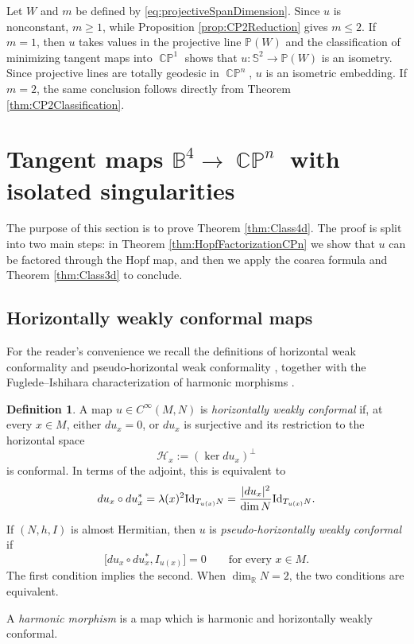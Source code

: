 \documentclass[11pt]{article}
\theoremstyle{plain}
\numberwithin{equation}{section}
\theoremstyle{definition}
\newtheorem{definition}[theorem]{Definition}
\let\oldendproof\endproof
\renewenvironment{proof}[1][\proofname]{%
\oldproof[\upshape \bfseries #1]%
}{\oldendproof}
\def \R {\mathbb{R}}
\def \mc{\mathcal}
\def \mb{\mathbb}
\def \Id{\textup{Id}}
\DeclareMathOperator{\CP}{\mathbb{CP}}
\begin{document}
\begin{proof}[Proof of Theorem \ref{thm:Class3d}]
Let $W$ and $m$ be defined by \eqref{eq:projectiveSpanDimension}.  Since
$u$ is nonconstant, $m\geq1$, while
Proposition \ref{prop:CP2Reduction} gives $m\leq2$.
If $m=1$, then $u$ takes values in the projective line $\mb P(W)$ and the
classification of minimizing tangent maps into $\CP^1$
\cite{Brezis1986} shows that
$u\colon\mb S^2\to\mb P(W)$ is an isometry.  Since projective lines are
totally geodesic in $\CP^n$, $u$ is an isometric embedding.  If
$m=2$, the same conclusion follows directly from Theorem
\ref{thm:CP2Classification}.  
\end{proof}

\section{Tangent maps \texorpdfstring{$\mb B^4\to \CP^n$}{B4 to CPn} with isolated singularities}\label{sec:B4CPn}

The purpose of this section is to prove Theorem \ref{thm:Class4d}. The proof is split into two main steps: in Theorem \ref{thm:HopfFactorizationCPn} we show that $u$ can be factored through the Hopf map, and then we apply the coarea formula and Theorem \ref{thm:Class3d} to conclude.


\subsection{Horizontally weakly conformal maps}

For the reader's convenience we recall the definitions of horizontal weak conformality
\cite[Definition~2.4.2]{Baird2003} and pseudo-horizontal weak conformality
\cite[Definition~8.2.3]{Baird2003}, together with the Fuglede--Ishihara
characterization of harmonic morphisms \cite[Theorem~4.2.2]{Baird2003}.

\begin{definition}
\label{def:HWC}
A map $u\in C^\infty(M,N)$ is \textit{horizontally weakly conformal} if, at every
$x\in M$, either $du_x=0$, or $du_x$ is surjective and its restriction
to the horizontal space
\[
    \mc H_x:=(\ker du_x)^\perp
\]
is conformal.  In terms of the adjoint, this is equivalent to
\[
    du_x\circ du_x^*
    =\lambda(x)^2\Id_{T_{u(x)}N}
    =\frac{|du_x|^2}{\dim N}\Id_{T_{u(x)}N}.
\]

If $(N,h,I)$ is almost Hermitian, then $u$ is
\textit{pseudo-horizontally weakly conformal} if
\begin{equation}
    \label{eq:PseudoHorizontalWeakConformality}
    \bigl[du_x\circ du_x^*,I_{u(x)}\bigr]=0
    \qquad\text{for every }x\in M.
\end{equation}
The first condition implies the second.  When $\dim_\R N=2$, the two
conditions are equivalent.

A \textit{harmonic morphism} is a map which  is harmonic and horizontally weakly conformal.
\end{definition}
\end{document}

